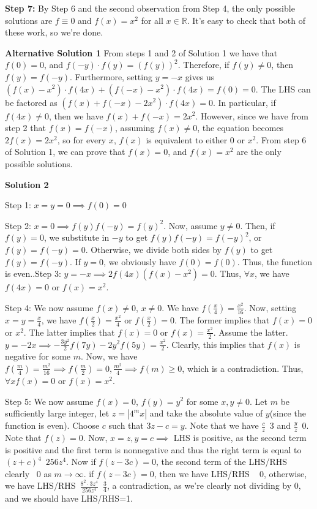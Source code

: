\begin{enumerate}
 \textbf{Step 7:} By Step 6 and the second observation from Step 4, the only possible solutions are $f \equiv 0$ and $f(x) = x^2$ for all $x \in \mathbb{R}.$ It's easy to check that both of these work, so we're done.

 \textbf{Alternative Solution 1} From steps 1 and 2 of Solution 1 we have that $f(0)=0$, and $f(-y) \cdot f(y)=(f(y))^2$. Therefore, if $f(y) \ne 0$, then $f(y)=f(-y)$. Furthermore, setting $y=-x$ gives us $(f(x)-x^2) \cdot f(4x) + (f(-x)-x^2) \cdot f(4x) = f(0) = 0$. The LHS can be factored as $(f(x)+f(-x)-2x^2) \cdot f(4x) = 0$. In particular, if $f(4x) \ne 0$, then we have $f(x)+f(-x)=2x^2$. However, since we have from step 2 that $f(x)=f(-x)$, assuming $f(x) \ne 0$, the equation becomes $2f(x)=2x^2$, so for every $x$, $f(x)$ is equivalent to either $0$ or $x^2$. From step 6 of Solution 1, we can prove that $f(x)=0$, and $f(x)=x^2$ are the only possible solutions.

 



\textbf{Solution 2}

Step 1: $x=y=0 \implies f(0)=0$

 Step 2: $x=0 \implies f(y)f(-y)=f(y)^{2}$. Now, assume $y \not = 0$. Then, if $f(y)=0$, we substitute in $-y$ to get $f(y)f(-y)=f(-y)^{2}$, or $f(y)=f(-y)=0$. Otherwise, we divide both sides by $f(y)$ to get $f(y)=f(-y)$. If $y=0$, we obviously have $f(0)=f(0)$. Thus, the function is even..Step 3: $y=-x \implies 2f(4x)(f(x)-x^{2})=0$. Thus, $\forall x$, we have $f(4x)=0$ or $f(x)=x^{2}$.

 Step 4: We now assume $f(x) \not = 0$, $x\not = 0$. We have $f(\frac{x}{4})=\frac{x^{2}}{16}$. Now, setting $x=y=\frac{x}{4}$, we have $f(\frac{x}{2})=\frac{x^{2}}{4}$ or $f(\frac{x}{2})=0$. The former implies that $f(x)=0$ or $x^{2}$. The latter implies that $f(x)=0$ or $f(x)=\frac{x^{2}}{2}$. Assume the latter. $y=-2x \implies -\frac{3y^{2}}{2}f(7y)-{2y^{2}}f(5y)=\frac{x^{2}}{2}$. Clearly, this implies that $f(x)$ is negative for some $m$. Now, we have $f(\frac{m}{4})=\frac{m^{2}}{16} \implies f(\frac{m}{2})=0,\frac{m^{2}}{4} \implies f(m) \geq 0$, which is a contradiction. Thus, $\forall x$$f(x)=0$ or $f(x)=x^{2}$.

 Step 5: We now assume $f(x)=0$, $f(y)=y^{2}$ for some $x,y \not = 0$. Let $m$ be sufficiently large integer, let $z=|4^{m}x|$ and take the absolute value of $y$(since the function is even). Choose $c$ such that $3z-c=y$. Note that we have $\frac{c}{z}$~$3$ and $\frac{y}{z}$~$0$. Note that $f(z)=0$. Now, $x=z, y=c \implies$ LHS is positive, as the second term is positive and the first term is nonnegative and thus the right term is equal to $(z+c)^{4}$~$256z^{4}$. Now if $f(z-3c)=0$, the second term of the LHS/RHS clearly ~0 as $m \to \infty$. if $f(z-3c)=0$, then we have LHS/RHS ~ $0$, otherwise, we have LHS/RHS~$\frac{8^{2}\cdot 3z^{4}}{256z^{4}}$~$\frac{3}{4}$, a contradiction, as we're clearly not dividing by $0$, and we should have LHS/RHS=1.

 


 


\end{enumerate}